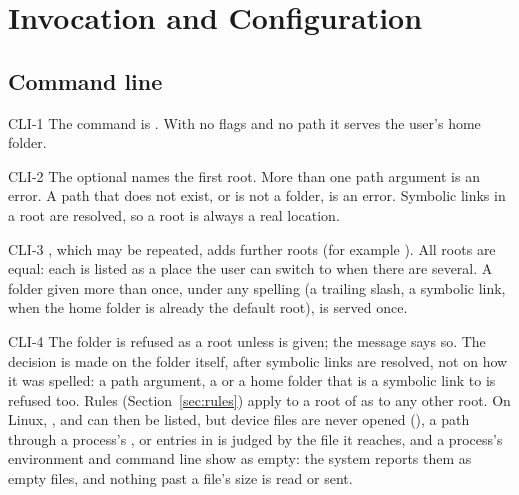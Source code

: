 \section{Invocation and Configuration}
\label{sec:invocation}

\subsection{Command line}

\begin{req}{CLI-1}
The command is .  With no flags and no path it serves the
user's home folder.
\end{req}

\begin{req}{CLI-2}
The optional  names the first root.  More than one path argument is an
error.  A path that does not exist, or is not a folder, is an error.  Symbolic links
in a root are resolved, so a root is always a real location.
\end{req}

\begin{req}{CLI-3}
, which may be repeated, adds further roots (for example
).  All roots are equal: each is listed as a place the user can
switch to when there are several.  A folder given more than once, under any
spelling (a trailing slash, a symbolic link,  when the home folder
is already the default root), is served once.
\end{req}

\begin{req}{CLI-4}
The folder \code{/} is refused as a root unless  is given;
the message says so.  The decision is made on the folder itself, after symbolic links
are resolved, not on how it was spelled: a path argument, a  or a home
folder that is a symbolic link to \code{/} is refused too.  Rules
(Section~\ref{sec:rules}) apply to a root of \code{/} as to any other root.  On
Linux, ,  and  can then be listed, but device files
are never opened (), a path through a process's ,  or
 entries in  is judged by the file it reaches, and a process's
environment and command line show as empty: the system reports them as empty files,
and nothing past a file's size is read or sent.
\end{req}

